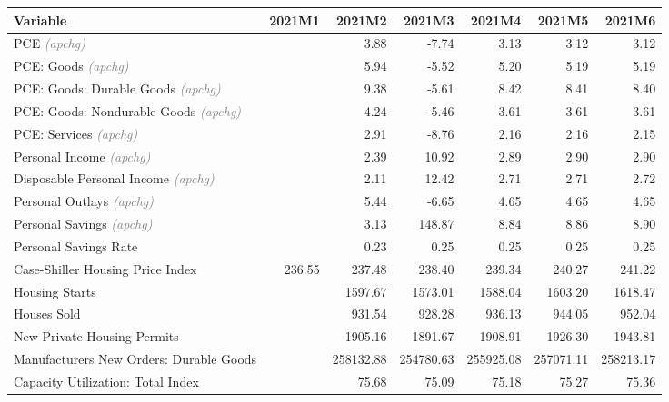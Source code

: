 \documentclass[11pt, letterpaper]{article}\usepackage[]{graphicx}\usepackage[]{color}
\begin{document}
\begin{table}[H]
\centering
\begingroup\fontsize{10pt}{12pt}\selectfont
\begin{tabular}{lrrrrrr}
  \hline
Variable & 2021M1 & 2021M2 & 2021M3 & 2021M4 & 2021M5 & 2021M6 \\ 
  \hline
PCE \textit{\footnotesize\textcolor{gray}{(apchg)}} &  & 3.88 & -7.74 & 3.13 & 3.12 & 3.12 \\ 
  PCE: Goods \textit{\footnotesize\textcolor{gray}{(apchg)}} &  & 5.94 & -5.52 & 5.20 & 5.19 & 5.19 \\ 
  PCE: Goods: Durable Goods \textit{\footnotesize\textcolor{gray}{(apchg)}} &  & 9.38 & -5.61 & 8.42 & 8.41 & 8.40 \\ 
  PCE: Goods: Nondurable Goods \textit{\footnotesize\textcolor{gray}{(apchg)}} &  & 4.24 & -5.46 & 3.61 & 3.61 & 3.61 \\ 
  PCE: Services \textit{\footnotesize\textcolor{gray}{(apchg)}} &  & 2.91 & -8.76 & 2.16 & 2.16 & 2.15 \\ 
  Personal Income \textit{\footnotesize\textcolor{gray}{(apchg)}} &  & 2.39 & 10.92 & 2.89 & 2.90 & 2.90 \\ 
  Disposable Personal Income \textit{\footnotesize\textcolor{gray}{(apchg)}} &  & 2.11 & 12.42 & 2.71 & 2.71 & 2.72 \\ 
  Personal Outlays \textit{\footnotesize\textcolor{gray}{(apchg)}} &  & 5.44 & -6.65 & 4.65 & 4.65 & 4.65 \\ 
  Personal Savings \textit{\footnotesize\textcolor{gray}{(apchg)}} &  & 3.13 & 148.87 & 8.84 & 8.86 & 8.90 \\ 
  Personal Savings Rate &  & 0.23 & 0.25 & 0.25 & 0.25 & 0.25 \\ 
  Case-Shiller Housing Price Index & 236.55 & 237.48 & 238.40 & 239.34 & 240.27 & 241.22 \\ 
  Housing Starts &  & 1597.67 & 1573.01 & 1588.04 & 1603.20 & 1618.47 \\ 
  Houses Sold &  & 931.54 & 928.28 & 936.13 & 944.05 & 952.04 \\ 
  New Private Housing Permits &  & 1905.16 & 1891.67 & 1908.91 & 1926.30 & 1943.81 \\ 
  Manufacturers New Orders: Durable Goods &  & 258132.88 & 254780.63 & 255925.08 & 257071.11 & 258213.17 \\ 
  Capacity Utilization: Total Index &  & 75.68 & 75.09 & 75.18 & 75.27 & 75.36 \\ 

\end{tabular}
\end{table}
\end{document}
